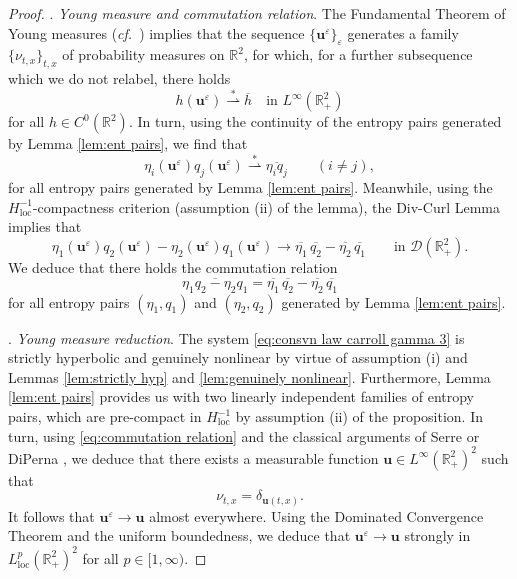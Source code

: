 \documentclass[11pt,a4paper,reqno]{amsart}
\numberwithin{equation}{section}
\theoremstyle{definition}
\theoremstyle{remark}
\newcommand{\bu}{\mathbf{u}}
\newcommand{\loc}{\mathrm{loc}}
\begin{document}
{\begin{proof}
   \smallskip 
   . \textit{Young measure and commutation relation}. The Fundamental Theorem of Young measures (\textit{cf.}~\cite[\S 2, Theorem 9.1.5]{Serre2}) implies that the sequence $\{\bu^\varepsilon\}_\varepsilon$ generates a family $\{\nu_{t,x}\}_{t,x}$ of probability measures on $\mathbb{R}^2$, for which, for a further subsequence which we do not relabel, there holds 
\begin{equation*}
    h(\bu^\varepsilon) \overset{*}{\rightharpoonup} \overline{h} \quad \text{in } L^\infty(\mathbb{R}^2_+) 
\end{equation*}
for all $h \in C^0(\mathbb{R}^2)$. In turn, using the continuity of the entropy pairs generated by Lemma \ref{lem:ent pairs}, we find that 
 \begin{equation*}
     \eta_i(\bu^\varepsilon) q_j(\bu^\varepsilon) \overset{*}{\rightharpoonup} \overline{\eta_i q_j} \qquad (i \neq j), 
 \end{equation*}
 for all entropy pairs generated by Lemma \ref{lem:ent pairs}. Meanwhile, using the $H^{-1}_\loc$-compactness criterion (assumption (ii) of the lemma), the Div-Curl Lemma implies that
 \begin{equation*}
     \eta_1(\bu^\varepsilon) q_2(\bu^\varepsilon) - \eta_2(\bu^\varepsilon) q_1(\bu^\varepsilon) \to \overline{\eta_1} \, \overline{q_2} - \overline{\eta_2} \, \overline{q_1} \qquad \text{in } \mathcal{D}(\mathbb{R}^2_+). 
 \end{equation*}
We deduce that there holds the commutation relation 
    \begin{equation}\label{eq:commutation relation}
        \overline{\eta_1 q_2 - \eta_2 q_1} = \overline{\eta_1} \, \overline{q_2} - \overline{\eta_2} \, \overline{q_1}
    \end{equation}
    for all entropy pairs $(\eta_1,q_1)$ and $(\eta_2,q_2)$ generated by Lemma \ref{lem:ent pairs}. 



    \smallskip 
    . \textit{Young measure reduction}. The system \eqref{eq:consvn law carroll gamma 3} is strictly hyperbolic and genuinely nonlinear by virtue of assumption (i) and Lemmas \ref{lem:strictly hyp} and \ref{lem:genuinely nonlinear}. Furthermore, Lemma \ref{lem:ent pairs} provides us with two linearly independent families of entropy pairs, which are pre-compact in $H^{-1}_\loc$ by assumption (ii) of the proposition. In turn, using \eqref{eq:commutation relation} and the classical arguments of Serre \cite[\S 2]{Serre2} or DiPerna \cite{DiPerna83a}, we deduce that there exists a measurable function $\bu \in L^\infty(\mathbb{R}^2_+)^2$ such that 
    \begin{equation*}
        \nu_{t,x} = \delta_{\bu(t,x)}. 
    \end{equation*}
    It follows that $\bu^\varepsilon \to \bu$ almost everywhere. Using the Dominated Convergence Theorem and the uniform boundedness, we deduce that $\bu^\varepsilon \to \bu$ strongly in $L^p_\loc(\mathbb{R}^2_+)^2$ for all $p \in [1,\infty)$. 
\end{proof}




}
\end{document}
